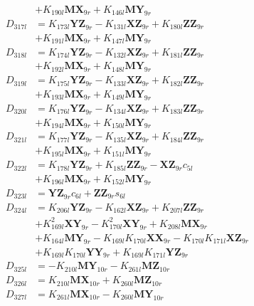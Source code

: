 \begin{multicols}{2}
\begin{align}
&+ K_{190l}\mathbf{MX}_{9r} + K_{146l}\mathbf{MY}_{9r} \nonumber \\
D_{317l} &= K_{173l}\mathbf{YZ}_{9r} - K_{131l}\mathbf{XZ}_{9r} + K_{180l}\mathbf{ZZ}_{9r}  \nonumber \\
&+ K_{191l}\mathbf{MX}_{9r} + K_{147l}\mathbf{MY}_{9r} \nonumber \\
D_{318l} &= K_{174l}\mathbf{YZ}_{9r} - K_{132l}\mathbf{XZ}_{9r} + K_{181l}\mathbf{ZZ}_{9r}  \nonumber \\
&+ K_{192l}\mathbf{MX}_{9r} + K_{148l}\mathbf{MY}_{9r} \nonumber \\
D_{319l} &= K_{175l}\mathbf{YZ}_{9r} - K_{133l}\mathbf{XZ}_{9r} + K_{182l}\mathbf{ZZ}_{9r}  \nonumber \\
&+ K_{193l}\mathbf{MX}_{9r} + K_{149l}\mathbf{MY}_{9r} \nonumber \\
D_{320l} &= K_{176l}\mathbf{YZ}_{9r} - K_{134l}\mathbf{XZ}_{9r} + K_{183l}\mathbf{ZZ}_{9r}  \nonumber \\
&+ K_{194l}\mathbf{MX}_{9r} + K_{150l}\mathbf{MY}_{9r} \nonumber \\
D_{321l} &= K_{177l}\mathbf{YZ}_{9r} - K_{135l}\mathbf{XZ}_{9r} + K_{184l}\mathbf{ZZ}_{9r}  \nonumber \\
&+ K_{195l}\mathbf{MX}_{9r} + K_{151l}\mathbf{MY}_{9r} \nonumber \\
D_{322l} &= K_{178l}\mathbf{YZ}_{9r} + K_{185l}\mathbf{ZZ}_{9r} - \mathbf{XZ}_{9r}c_{5l}  \nonumber \\
&+ K_{196l}\mathbf{MX}_{9r} + K_{152l}\mathbf{MY}_{9r} \nonumber \\
D_{323l} &= \mathbf{YZ}_{9r}c_{6l} + \mathbf{ZZ}_{9r}s_{6l} \nonumber \\
D_{324l} &= K_{206l}\mathbf{YZ}_{9r} - K_{162l}\mathbf{XZ}_{9r} + K_{207l}\mathbf{ZZ}_{9r}  \nonumber \\
&+ K_{169l}^2\mathbf{XY}_{9r} - K_{170l}^2\mathbf{XY}_{9r} + K_{208l}\mathbf{MX}_{9r}  \nonumber \\
&+ K_{164l}\mathbf{MY}_{9r} - K_{169l}K_{170l}\mathbf{XX}_{9r} - K_{170l}K_{171l}\mathbf{XZ}_{9r}  \nonumber \\
&+ K_{169l}K_{170l}\mathbf{YY}_{9r} + K_{169l}K_{171l}\mathbf{YZ}_{9r} \nonumber \\
D_{325l} &= - K_{210l}\mathbf{MY}_{10r} - K_{261l}\mathbf{MZ}_{10r} \nonumber \\
D_{326l} &= K_{210l}\mathbf{MX}_{10r} + K_{260l}\mathbf{MZ}_{10r} \nonumber \\
D_{327l} &= K_{261l}\mathbf{MX}_{10r} - K_{260l}\mathbf{MY}_{10r} \nonumber \\

\end{align}
\end{multicols}
